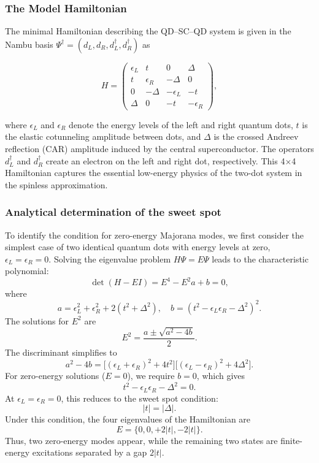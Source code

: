 \documentclass[11pt, letterpaper, titlepage]{article}
\begin{document}
\subsubsection{The Model Hamiltonian}

The minimal Hamiltonian describing the QD–SC–QD system is given in the Nambu basis $\Psi^\dagger = (d_L, d_R, d_L^\dagger, d_R^\dagger)$ as

\begin{equation}
  H = \begin{pmatrix}
    \epsilon_L & t & 0 & \Delta \\
    t & \epsilon_R & -\Delta & 0 \\
    0 & -\Delta & -\epsilon_L & -t \\
    \Delta & 0 & -t & -\epsilon_R
  \end{pmatrix},
\end{equation}

where $\epsilon_L$ and $\epsilon_R$ denote the energy levels of the left and right quantum dots, $t$ is the elastic cotunneling amplitude between dots, and $\Delta$ is the crossed Andreev reflection (CAR) amplitude induced by the central superconductor. The operators $d_L^\dagger$ and $d_R^\dagger$ create an electron on the left and right dot, respectively. This 4×4 Hamiltonian captures the essential low-energy physics of the two-dot system in the spinless approximation.

\subsubsection{Analytical determination of the sweet spot}
To identify the condition for zero-energy Majorana modes, we first consider the simplest case of two identical quantum dots with energy levels at zero, \(\epsilon_L = \epsilon_R = 0\). Solving the eigenvalue problem \(H \Psi = E \Psi\) leads to the characteristic polynomial:
\[
\det(H - E I) = E^4 - E^2 a + b = 0,
\]
where
\[
a = \epsilon_L^2 + \epsilon_R^2 + 2(t^2 + \Delta^2), \quad
b = (t^2 - \epsilon_L \epsilon_R - \Delta^2)^2.
\]
The solutions for \(E^2\) are
\[
E^2 = \frac{a \pm \sqrt{a^2 - 4b}}{2}.
\]
The discriminant simplifies to 
\[
a^2 - 4b = \big[(\epsilon_L + \epsilon_R)^2 + 4t^2\big] \big[(\epsilon_L - \epsilon_R)^2 + 4\Delta^2\big].
\]
For zero-energy solutions (\(E = 0\)), we require \(b = 0\), which gives
\[
t^2 - \epsilon_L \epsilon_R - \Delta^2 = 0.
\]
At \(\epsilon_L = \epsilon_R = 0\), this reduces to the sweet spot condition:
\[
|t| = |\Delta|.
\]
Under this condition, the four eigenvalues of the Hamiltonian are
\[
E = \{0, 0, +2|t|, -2|t|\}.
\]
Thus, two zero-energy modes appear, while the remaining two states are finite-energy excitations separated by a gap \(2|t|\).
\end{document}
